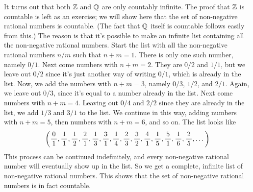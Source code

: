 It turns out that both ${\mathbb Z}$ and ${\mathbb Q}$ are only countably infinite.
The proof that ${\mathbb Z}$ is countable is left as an exercise; we 
will show here that the set of non-negative
rational numbers is countable.  (The fact that ${\mathbb Q}$ itself is countable 
follows easily from this.)  The reason is that it's possible to make
an infinite list containing all the non-negative rational numbers.  Start the
list with all the non-negative rational numbers $n/m$ such that $n+m=1$.  There
is only one such number, namely $0/1$.  Next come numbers with
$n+m=2$.  They are $0/2$ and $1/1$, but we leave out $0/2$ since
it's just another way of writing $0/1$, which is already in the
list.  Now, we add the numbers with $n+m=3$, namely
$0/3$, $1/2$, and $2/1$.  Again, we leave out $0/3$, since it's
equal to a number already in the list.  Next come numbers
with $n+m=4$.  Leaving out $0/4$ and $2/2$ since they are already
in the list, we add $1/3$ and $3/1$ to the list.  We continue
in this way, adding numbers with $n+m=5$, then numbers with
$n+m=6$, and so on.  The list looks like
\[
    \left( {\,0\,\over 1}, {\,1\,\over 1}, {\,1\,\over 2}, {\,2\,\over 1},
            {\,1\,\over 3}, {\,3\,\over 1}, {\,1\,\over 4}, {\,2\,\over 3},
              {\,3\,\over 2}, {\,4\,\over 1}, {\,1\,\over 5},
               {\,5\,\over 1}, {\,1\,\over 6}, {\,2\,\over 5},\dots
    \right)
\]
This process can be continued indefinitely, and every non-negative rational
number will eventually show up in the list.  So we get a
complete, infinite list of non-negative rational numbers.  This shows that
the set of non-negative rational numbers is in fact countable.

